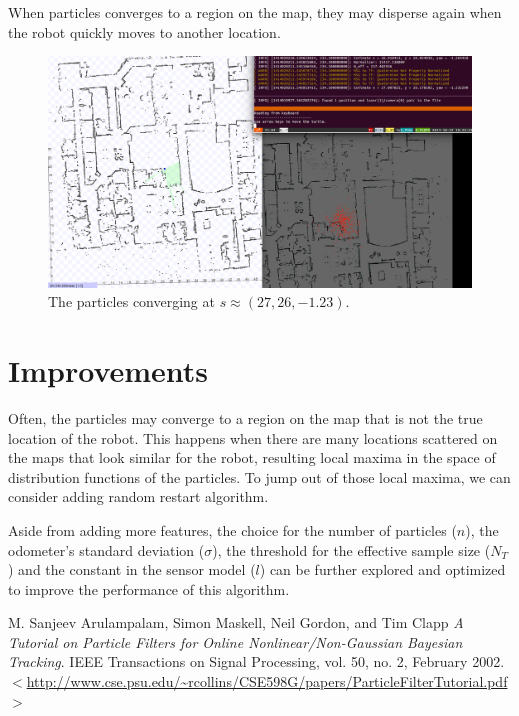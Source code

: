 \documentclass[10pt]{article}
\begin{document}
When particles converges to a region on the map, they may disperse again when the robot quickly moves to another location. 

\begin{figure}[ht!]
\centering
\advance\leftskip-3cm
\includegraphics[width=180mm]{pic.png}
\caption{The particles converging at $s \approx (27,26,-1.23)$.}
\label{figCir1}
\end{figure}

\section{Improvements}
Often, the particles may converge to a region on the map that is not the true location of the robot. This happens when there are many locations scattered on the maps that look similar for the robot, resulting local maxima in the space of distribution functions of the particles. To jump out of those local maxima, we can consider adding random restart algorithm. 

Aside from adding more features, the choice for the number of particles ($n$), the odometer's standard deviation ($\sigma$), the threshold for the effective sample size ($N_T$) and the constant in the sensor model ($l$) can be further explored and optimized to improve the performance of this algorithm. 


\begin{thebibliography}{9}

  M. Sanjeev Arulampalam, Simon Maskell, Neil Gordon, and Tim Clapp
  \emph{A Tutorial on Particle Filters for Online
Nonlinear/Non-Gaussian Bayesian Tracking}.
  IEEE Transactions on Signal Processing, vol. 50, no. 2, 
  February 2002. $<$\url{http://www.cse.psu.edu/~rcollins/CSE598G/papers/ParticleFilterTutorial.pdf}$>$
\end{thebibliography}
\end{document}
